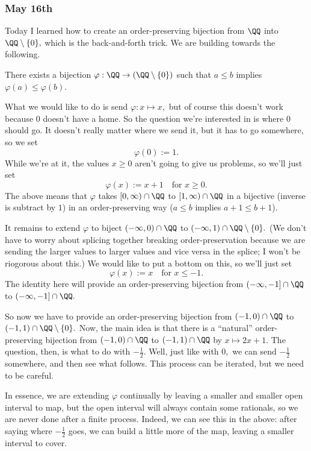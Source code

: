 \subsubsection{May 16th}
Today I learned how to create an order-preserving bijection from $\QQ$ into $\QQ\setminus\{0\},$ which is the back-and-forth trick. We are building towards the following.
\begin{proposition}
    There exists a bijection $\varphi:\QQ\to(\QQ\setminus\{0\})$ such that $a\le b$ implies $\varphi(a)\le\varphi(b).$
\end{proposition}
What we would like to do is send $\varphi:x\mapsto x,$ but of course this doesn't work because $0$ doesn't have a home. So the question we're interested in is where $0$ should go. It doesn't really matter where we send it, but it has to go somewhere, so we set
\[\varphi(0):=1.\]
While we're at it, the values $x\ge0$ aren't going to give us problems, so we'll just set
\[\varphi(x):=x+1\quad\text{for }x\ge0.\]
The above means that $\varphi$ takes $[0,\infty)\cap\QQ$ to $[1,\infty)\cap\QQ$ in a bijective (inverse is subtract by $1$) in an order-preserving way ($a\le b$ implies $a+1\le b+1$).

It remains to extend $\varphi$ to biject $(-\infty,0)\cap\QQ$ to $(-\infty,1)\cap\QQ\setminus\{0\}.$ (We don't have to worry about splicing together breaking order-preservation because we are sending the larger values to larger values and vice versa in the splice; I won't be riogorous about this.) We would like to put a bottom on this, so we'll just set
\[\varphi(x):=x\quad\text{for }x\le-1.\]
The identity here will provide an order-preserving bijection from $(-\infty,-1]\cap\QQ$ to $(-\infty,-1]\cap\QQ.$

So now we have to provide an order-preserving bijection from $(-1,0)\cap\QQ$ to $(-1,1)\cap\QQ\setminus\{0\}.$ Now, the main idea is that there is a ``natural'' order-preserving bijection from $(-1,0)\cap\QQ$ to $(-1,1)\cap\QQ$ by $x\mapsto2x+1.$ The question, then, is what to do with $-\frac12.$ Well, just like with $0,$ we can send $-\frac12$ somewhere, and then see what follows. This process can be iterated, but we need to be careful.

In essence, we are extending $\varphi$ continually by leaving a smaller and smaller open interval to map, but the open interval will always contain some rationals, so we are never done after a finite process. Indeed, we can see this in the above: after saying where $-\frac12$ goes, we can build a little more of the map, leaving a smaller interval to cover.

